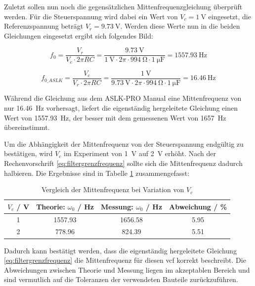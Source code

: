 \documentclass[../main_config.tex]{subfiles}
\begin{document}
Zuletzt sollen nun noch die gegensätzlichen Mittenfrequenzgleichung überprüft werden. Für die Steuerspannung wird dabei ein Wert von $V_c = \SI{1}{\volt}$ eingesetzt, die Referenzspannung beträgt $V_r = \SI{9.73}{\volt}$. Werden diese Werte nun in die beiden Gleichungen eingesetzt ergibt sich folgendes Bild:\par
\medskip

\begin{equation}
    f_0 = \frac{V_r}{V_c \cdot 2\pi RC} = \frac{\SI{9.73}{\volt}}{\SI{1}{\volt} \cdot 2\pi \cdot \SI{994}{\ohm} \cdot \SI{1}{\micro\farad}} = \SI{1557.93}{\hertz}
\end{equation}

\begin{equation}
    f_{0\_ASLK} =  \frac{V_c}{V_r \cdot 2\pi RC} = \frac{\SI{1}{\volt}}{\SI{9.73}{\volt} \cdot 2\pi \cdot \SI{994}{\ohm} \cdot \SI{1}{\micro\farad}} = \SI{16.46}{\hertz}
\end{equation}

Während die Gleichung aus dem ASLK-PRO Manual eine Mittenfrequenz von nur \SI{16.46}{\hertz} vorhersagt, liefert die eigenständig hergeleitete Gleichung einen Wert von \SI{1557.93}{\hertz}, der besser mit dem gemessenen Wert von \SI{1657}{\hertz} übereinstimmt.\par
\medskip

Um die Abhängigkeit der Mittenfrequenz von der Steuerspannung endgültig zu bestätigen, wird $V_c$ im Experiment von \SI{1}{\volt} auf \SI{2}{\volt} erhöht. Nach der Rechenvorschrift \ref{eq:filtergrenzfrequenz} sollte sich die Mittenfrequenz dadurch halbieren. Die Ergebnisse sind in Tabelle \ref{tab:mittenfrequenzen3} zusammengefasst:\par
\medskip


\begin{table}[h]
    \centering
    \begin{tabular}{c|c|c|c}
        \textbf{$V_c$ / \si{\volt}} & \textbf{Theorie: $\omega_0$ / \si{\hertz}} & \textbf{Messung: $\omega_0$ / \si{\hertz}} & \textbf{Abweichung / \%} \\ \hline
        1 & 1557.93 & 1656.58 & 5.95 \\
        2 & 778.96 & 824.39 & 5.51\\
    \end{tabular}
    \caption{Vergleich der Mittenfrequenz bei Variation von $V_c$}
    \label{tab:mittenfrequenzen3}
\end{table}

Dadurch kann bestätigt werden, dass die eigenständig hergeleitete Gleichung \ref{eq:filtergrenzfrequenz} die Mittenfrequenz für diesen \gls{vcf} korrekt beschreibt. Die Abweichungen zwischen Theorie und Messung liegen im akzeptablen Bereich und sind vermutlich auf die Toleranzen der verwendeten Bauteile zurückzuführen.\par
\medskip
\end{document}
